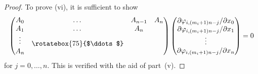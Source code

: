\documentclass[10pt,a4paper]{amsart}
\numberwithin{equation}{section}
\begin{document}
\begin{proof}
To prove (vi), it is suf\/f\/icient to show
\begin{gather*}
\left(
\begin{matrix}
A_0 & \dots & A_{n-1} & A_n \\
A_1 & \dots & A_n & \\
\vdots & \raisebox{-0.1cm}{\rotatebox{75}{$\ddots$}} & & \\
A_n & & &
\end{matrix}
\right)
\left(
\begin{matrix}
\partial \varphi _{i,(m_i+1)n-j}/\partial x_0 \\
\partial \varphi _{i,(m_i+1)n-j}/\partial x_1 \\
\vdots \\
\partial \varphi _{i,(m_i+1)n-j}/\partial x_n
\end{matrix}
\right) = 0
\end{gather*}
for $j=0,\dots ,n$. This is verif\/ied with the aid of part~(v).
\end{proof}
\end{document}
